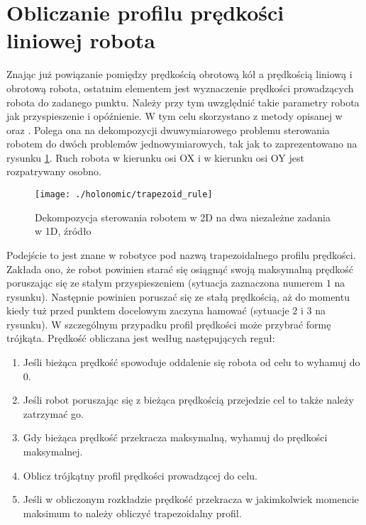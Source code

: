 \section{Obliczanie profilu prędkości liniowej robota \label{sec:trapezoid_vel}}
Znając już powiązanie pomiędzy prędkością obrotową kół a prędkością liniową i obrotową robota, ostatnim elementem jest wyznaczenie prędkości prowadzących 
robota do zadanego punktu. Należy przy tym uwzględnić takie parametry robota jak przyspieszenie i opóźnienie. W tym celu skorzystano z metody opisanej w 
\cite{trapezy1} oraz \cite{trapezy2}. Polega ona na dekompozycji dwuwymiarowego problemu sterowania robotem do dwóch problemów jednowymiarowych, tak jak to zaprezentowano
na rysunku \ref{fig:trapezoid_rule}. Ruch robota w kierunku osi OX i w kierunku osi OY jest rozpatrywany osobno. 
\begin{figure}[H]
\centering
\texttt{[image: ./holonomic/trapezoid\_rule]}
\caption{ Dekompozycja sterowania robotem w 2D na dwa niezależne zadania w 1D, źródło\cite{trapezy1}}\label{fig:trapezoid_rule}
\end{figure}
Podejście to jest znane w robotyce pod nazwą trapezoidalnego profilu prędkości.
Zakłada ono, że robot powinien starać się osiągnąć swoją maksymalną prędkość poruszając się ze stałym przyspieszeniem (sytuacja zaznaczona numerem $1$ na rysunku).
Następnie powinien poruszać się ze stałą prędkością, aż do momentu kiedy tuż przed punktem docelowym zaczyna hamować (sytuacje $2$ i $3$ na rysunku). 
W szczególnym przypadku profil prędkości może przybrać formę trójkąta.
Prędkość obliczana jest według następujących reguł:
\begin{enumerate}
\item Jeśli bieżąca prędkość spowoduje oddalenie się robota od celu to wyhamuj do 0.
\item Jeśli robot poruszając się z bieżąca prędkością przejedzie cel to także należy zatrzymać go.
\item Gdy bieżąca prędkość przekracza maksymalną, wyhamuj do prędkości maksymalnej.
\item Oblicz trójkątny profil prędkości prowadzącej do celu.
\item Jeśli w obliczonym rozkładzie prędkość przekracza w jakimkolwiek momencie maksimum to należy obliczyć trapezoidalny profil. 
\end{enumerate} 


